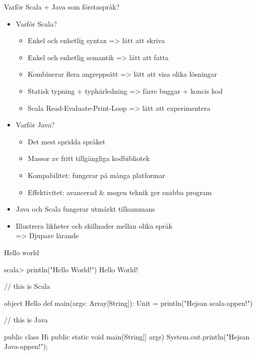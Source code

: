 \begin{Slide}{Varför Scala + Java som förstaspråk?}
\begin{itemize}
\item Varför Scala?
\begin{itemize}
\item Enkel och enhetlig syntax => lätt att skriva
\item Enkel och enhetlig semantik => lätt att fatta 
\item Kombinerar flera angreppsätt => lätt att visa olika lösningar
\item Statisk typning + typhärledning =>  färre buggar + koncis kod
\item Scala Read-Evaluate-Print-Loop => lätt att experimentera
\end{itemize}

\item Varför Java?
\begin{itemize}
\item Det mest spridda språket
\item Massor av fritt tillgängliga kodbibliotek
\item Kompabilitet: fungerar på många platformar
\item Effektivitet: avancerad \& mogen teknik ger snabba program
\end{itemize}
\item Java och Scala fungerar utmärkt tillsammans
\item Illustrera likheter och skillnader mellan olika språk \\ => Djupare lärande
\end{itemize}
\end{Slide}

\begin{Slide}{Hello world}

\begin{REPLnonum}
scala> println("Hello World!")
Hello World!
\end{REPLnonum}

\begin{Code}
// this is Scala 

object Hello {
  def main(args: Array[String]): Unit = {
    println("Hejsan scala-appen!")
  }
}
\end{Code}


\begin{Code}[language=Java]
// this is Java 

public class Hi {
    public static void main(String[] args) {
        System.out.println("Hejsan Java-appen!");
    }
}
\end{Code}

\end{Slide}

